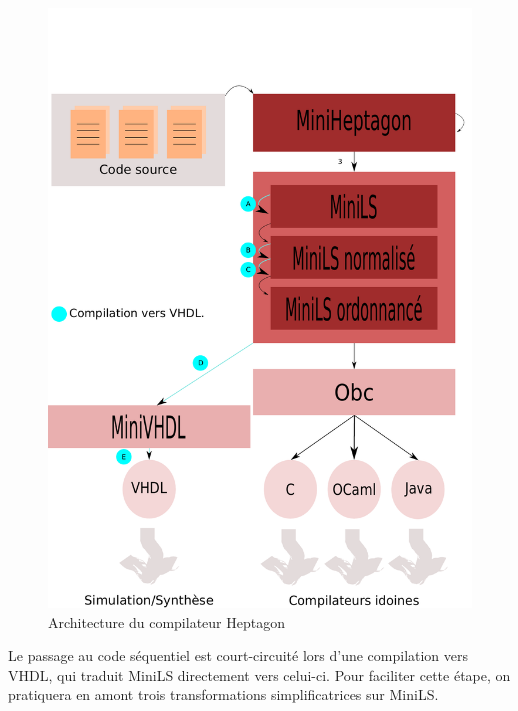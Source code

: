 \documentclass[a4paper]{article}
\newcommand{\LANG}{{\sc Heptagon}}
\begin{document}

\begin{figure}[htp]
  \centering
  \includegraphics[scale=0.5]{archi}
  \caption{Architecture du compilateur \LANG}
  \label{fig:archi}
\end{figure}

Le passage au code s\'equentiel est court-circuit\'e lors d'une compilation vers
VHDL, qui traduit MiniLS directement vers celui-ci. Pour faciliter cette \'etape,
on pratiquera en amont trois transformations simplificatrices sur MiniLS.
\end{document}
